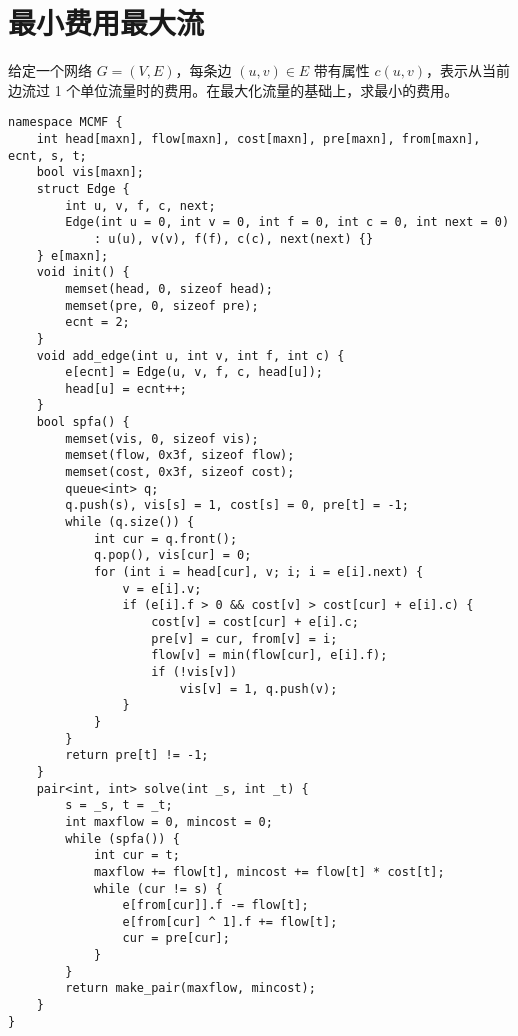\section{最小费用最大流}

\par 给定一个网络 $G=(V, E)$，每条边 $(u, v) \in E$ 带有属性 $c(u, v)$，表示从当前边流过 1 个单位流量时的费用。在最大化流量的基础上，求最小的费用。

\begin{verbatim}
namespace MCMF {
    int head[maxn], flow[maxn], cost[maxn], pre[maxn], from[maxn], ecnt, s, t;
    bool vis[maxn];
    struct Edge {
        int u, v, f, c, next;
        Edge(int u = 0, int v = 0, int f = 0, int c = 0, int next = 0)
            : u(u), v(v), f(f), c(c), next(next) {}
    } e[maxn];
    void init() {
        memset(head, 0, sizeof head);
        memset(pre, 0, sizeof pre);
        ecnt = 2;
    }
    void add_edge(int u, int v, int f, int c) {
        e[ecnt] = Edge(u, v, f, c, head[u]);
        head[u] = ecnt++;
    }
    bool spfa() {
        memset(vis, 0, sizeof vis);
        memset(flow, 0x3f, sizeof flow);
        memset(cost, 0x3f, sizeof cost);
        queue<int> q;
        q.push(s), vis[s] = 1, cost[s] = 0, pre[t] = -1;
        while (q.size()) {
            int cur = q.front();
            q.pop(), vis[cur] = 0;
            for (int i = head[cur], v; i; i = e[i].next) {
                v = e[i].v;
                if (e[i].f > 0 && cost[v] > cost[cur] + e[i].c) {
                    cost[v] = cost[cur] + e[i].c;
                    pre[v] = cur, from[v] = i;
                    flow[v] = min(flow[cur], e[i].f);
                    if (!vis[v])
                        vis[v] = 1, q.push(v);
                }
            }
        }
        return pre[t] != -1;
    }
    pair<int, int> solve(int _s, int _t) {
        s = _s, t = _t;
        int maxflow = 0, mincost = 0;
        while (spfa()) {
            int cur = t;
            maxflow += flow[t], mincost += flow[t] * cost[t];
            while (cur != s) {
                e[from[cur]].f -= flow[t];
                e[from[cur] ^ 1].f += flow[t];
                cur = pre[cur];
            }
        }
        return make_pair(maxflow, mincost);
    }
}
\end{verbatim}